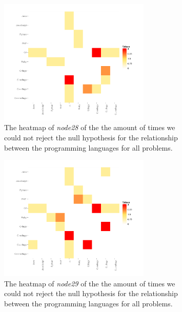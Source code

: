 \begin{figure}[h]
    \begin{subfigure}[b]{0.45\textwidth}
        \includegraphics[width=\textwidth, height=6cm]{graphs/heatmap3.png}
        \caption{The heatmap of \textit{node28} of the the amount of times we could not reject the null hypothesis for the relationship between the programming languages for all problems.}
        \label{fig:heatmap_3}
    \end{subfigure}
    \hfill        
    \begin{subfigure}[b]{0.45\textwidth}
        \includegraphics[width=\textwidth, height=6cm]{graphs/heatmap2.png}
        \caption{The heatmap of \textit{node29} of the the amount of times we could not reject the null hypothesis for the relationship between the programming languages for all problems.}
        \label{fig:heatmap_2}
    \end{subfigure}
    \caption{}
    \label{fig:heatmap}
\end{figure}

